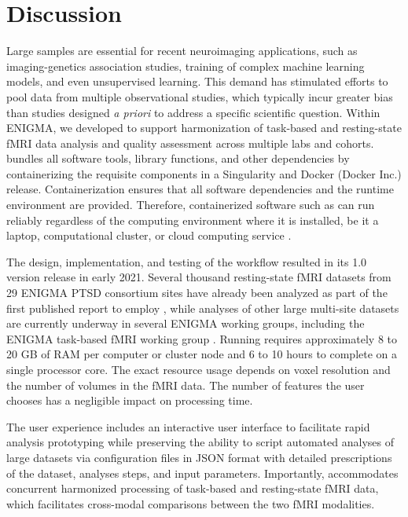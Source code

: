 \section{Discussion}

Large samples are essential for recent neuroimaging applications, such as
imaging-genetics association studies, training of complex machine learning
models, and even unsupervised learning. This demand has stimulated efforts
to pool data from multiple observational studies, which typically incur
greater bias than studies designed \emph{a priori} to address a specific
scientific question. Within ENIGMA, we developed  to support
harmonization of task-based and resting-state fMRI data analysis and
quality assessment across multiple labs and cohorts. 
bundles all software tools, library functions, and other dependencies by
containerizing the requisite components in a Singularity
\parencite{10.1371/journal.pone.0177459} and Docker (Docker Inc.) release.
Containerization ensures that all software dependencies and the runtime
environment are provided. Therefore, containerized software such as
 can run reliably regardless of the computing environment
where it is installed, be it a laptop, computational cluster, or cloud
computing service \parencite{10.1016/j.cels.2018.03.014}.

The design, implementation, and testing of the  workflow
resulted in its 1.0 version release in early 2021. Several thousand
resting-state fMRI datasets from 29 ENIGMA PTSD consortium sites have
already been analyzed as part of the first published report to employ
 \parencite{weis_thesis}, while analyses of other large
multi-site datasets are currently underway in several ENIGMA working
groups, including the ENIGMA task-based fMRI working group \parencite{veer_enigma_2019}. 
Running  requires approximately 8 to 20 GB of RAM per
computer or cluster node and 6 to 10 hours to complete on a single
processor core. The exact resource usage depends on voxel resolution and
the number of volumes in the fMRI data. The number of features the user
chooses has a negligible impact on processing time.

The  user experience includes an interactive user interface
to facilitate rapid analysis prototyping while preserving the ability to
script automated analyses of large datasets via configuration files in JSON
format with detailed prescriptions of the dataset, analyses steps, and
input parameters. Importantly,  accommodates concurrent
harmonized processing of task-based and resting-state fMRI data, which
facilitates cross-modal comparisons between the two fMRI modalities.

